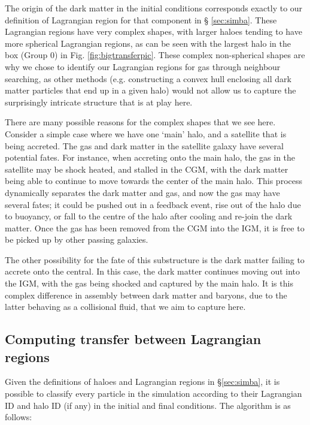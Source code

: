 The origin of the dark matter in the initial conditions corresponds exactly
to our definition of Lagrangian region for that component in \S
\ref{sec:simba}. These Lagrangian regions have very complex shapes, with
larger haloes tending to have more spherical Lagrangian regions, as can be
seen with the largest halo in the box (Group 0) in Fig.
\ref{fig:bigtransferpic}. These complex non-spherical shapes are why we
chose to identify our Lagrangian regions for gas through neighbour searching,
as other methods (e.g. constructing a convex hull enclosing all dark matter
particles that end up in a given halo) would not allow us to capture the
surprisingly intricate structure that is at play here.

There are many possible reasons for the complex shapes that we see here.
Consider a simple case where we have one `main' halo, and a satellite that is
being accreted. The gas and dark matter in the satellite galaxy have several
potential fates. For instance, when accreting onto the main halo, the gas in
the satellite may be shock heated, and stalled in the CGM, with the dark
matter being able to continue to move towards the center of the main halo.
This process dynamically separates the dark matter and gas, and now the gas
may have several fates; it could be pushed out in a feedback event, rise out
of the halo due to buoyancy, or fall to the centre of the halo after cooling
and re-join the dark matter. Once the gas has been removed from the CGM into
the IGM, it is free to be picked up by other passing galaxies.

The other possibility for the fate of this substructure is the dark matter
failing to accrete onto the central. In this case, the dark matter continues
moving out into the IGM, with the gas being shocked and captured by the main
halo. It is this complex difference in assembly between dark matter and
baryons, due to the latter behaving as a collisional fluid, that we aim to
capture here.

\subsection{Computing transfer between Lagrangian regions}

Given the definitions of haloes and Lagrangian regions in
\S \ref{sec:simba}, it is possible to classify every particle in the
simulation according to their Lagrangian ID and halo ID (if any) in the
initial and final conditions. The algorithm is as follows:

